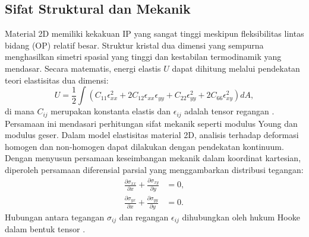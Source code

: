 \subsection{Sifat Struktural dan Mekanik}
Material 2D memiliki kekakuan IP yang sangat tinggi meskipun fleksibilitas lintas bidang (OP) relatif besar.
Struktur kristal dua dimensi yang sempurna menghasilkan simetri spasial yang tinggi dan kestabilan termodinamik yang mendasar.
Secara matematis, energi elastis \( U \) dapat dihitung melalui pendekatan teori elastisitas dua dimensi:
\begin{equation}
    U = \frac{1}{2} \int \left( C_{11}\epsilon_{xx}^2 + 2C_{12}\epsilon_{xx}\epsilon_{yy} + C_{22}\epsilon_{yy}^2 + 2C_{66}\epsilon_{xy}^2 \right) dA,
\end{equation}
di mana \( C_{ij} \) merupakan konstanta elastis dan \( \epsilon_{ij} \) adalah tensor regangan \cite{Lee2008}.
Persamaan ini mendasari perhitungan sifat mekanik seperti modulus Young dan modulus geser.
Dalam model elastisitas material 2D, analisis terhadap deformasi homogen dan non-homogen dapat dilakukan dengan pendekatan kontinuum.
Dengan menyusun persamaan keseimbangan mekanik dalam koordinat kartesian, diperoleh persamaan diferensial parsial yang menggambarkan distribusi tegangan:
\begin{align}
    \frac{\partial \sigma_{xx}}{\partial x} + \frac{\partial \sigma_{xy}}{\partial y} &= 0, \nonumber \\
    \frac{\partial \sigma_{yx}}{\partial x} + \frac{\partial \sigma_{yy}}{\partial y} &= 0.
\end{align}
Hubungan antara tegangan \( \sigma_{ij} \) dan regangan \( \epsilon_{ij} \) dihubungkan oleh hukum Hooke dalam bentuk tensor \cite{Timoshenko1970}.

